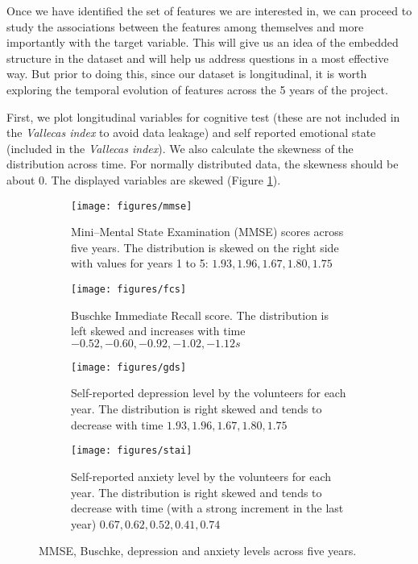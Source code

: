 \documentclass[11pt]{article}
\theoremstyle{definition}
\theoremstyle{remark}
\begin{document}
Once we have identified the set of features we are interested in, we can proceed to study the associations between the features among themselves and more importantly with the target variable. This will give us an idea of the embedded structure in the dataset and will help us address questions in a most effective way. But prior to doing this, since our dataset is longitudinal, it is worth exploring the temporal evolution of features across the 5 years of the project.

First, we plot longitudinal variables for cognitive test (these are not included in the \emph{Vallecas index} to avoid data leakage) and self reported emotional state (included in the \emph{Vallecas index}). We also calculate the skewness of the distribution across time. For normally distributed data, the skewness should be about 0. The displayed variables are skewed (Figure \ref{fig:staigds}). 

\begin{figure}[H]
    \centering
    \begin{subfigure}[t]{\textwidth}
        \centering
        \texttt{[image: figures/mmse]}
        \caption{Mini–Mental State Examination (MMSE) scores across five years. The distribution is skewed on the right side with values for years 1 to 5: $1.93, 1.96, 1.67, 1.80, 1.75$}
    \end{subfigure}
    
    \begin{subfigure}[t]{\textwidth}
        \centering
        \texttt{[image: figures/fcs]}
        \caption{Buschke Immediate Recall score. The distribution is left skewed and increases with time $-0.52, -0.60, -0.92, -1.02, -1.12s$ }
    \end{subfigure}%
    
     \begin{subfigure}[t]{\textwidth}
        \centering
        \texttt{[image: figures/gds]}
        \caption{Self-reported depression level by the volunteers for each year. The distribution is right skewed and tends to decrease with time $1.93, 1.96, 1.67, 1.80, 1.75$ }
    \end{subfigure}
    
    \begin{subfigure}[t]{\textwidth}
        \centering
        \texttt{[image: figures/stai]}
        \caption{Self-reported anxiety level by the volunteers for each year. The distribution is right skewed and tends to decrease with time (with a strong increment in the last year) $0.67, 0.62, 0.52, 0.41, 0.74$}
    \end{subfigure}%
    \caption{MMSE, Buschke, depression and anxiety levels across five years.} \label{fig:staigds}
\end{figure}
\end{document}
